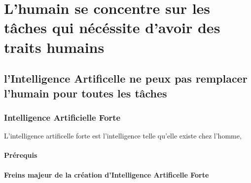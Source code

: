 \part{L'humain se concentre sur les tâches qui nécéssite d'avoir des traits humains}
\chapter{l'Intelligence Artificelle ne peux pas remplacer l'humain pour toutes les tâches}
\section{Intelligence Artificielle Forte}
L'intelligence artificelle forte est l'intelligence
telle qu'elle existe chez l'homme, 

\subsection{Prérequis}
\subsection{Freins majeur de la création d'Intelligence Artificelle Forte}